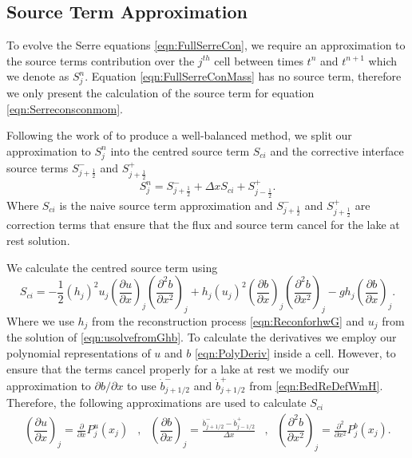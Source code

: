 \documentclass[times]{elsarticle}
\begin{document}
\subsection{Source Term Approximation}

To evolve the Serre equations \eqref{eqn:FullSerreCon}, we require an approximation to the source terms contribution over the $j^{th}$ cell between times $t^n$ and $t^{n+1}$ which we denote as $S^n_j$. Equation \eqref{eqn:FullSerreConMass} has no source term, therefore we only present the calculation of the source term for equation \eqref{eqn:Serreconsconmom}.

Following the work of \citet{Klein-etal-2004-2050} to produce a well-balanced method, we split our approximation to $S^n_j$ into the centred source term $S_{ci}$ and the corrective interface source terms $S^{-}_{j + \frac{1}{2}}$ and $S^{+}_{j + \frac{1}{2}}$
\begin{equation*}
S^n_j =  S^{-}_{j + \frac{1}{2}} + \Delta x S_{ci} + S^{+}_{j - \frac{1}{2}}.
\end{equation*}
Where $S_{ci}$ is the naive source term approximation and $S^{-}_{j + \frac{1}{2}}$ and $S^{+}_{j + \frac{1}{2}}$ are correction terms that ensure that the flux and source term cancel for the lake at rest solution. 

We calculate the centred source term using
\begin{equation*}
S_{ci} = -\frac{1}{2}\left(h_j\right)^2 {u_j}\left( \frac{\partial {u}}{\partial x} \right)_j \left(\frac{\partial^2 b}{\partial x^2} \right)_j  + h_j \left(u_j\right)^2 \left(\frac{\partial b}{\partial x}\right)_j \left(\frac{\partial^2 b}{\partial x^2}\right)_j - gh_j\left(\frac{\partial b}{\partial x}\right)_j.
\end{equation*}
Where we use $h_j$ from the reconstruction process \eqref{eqn:ReconforhwG} and $u_j$ from the solution of \eqref{eqn:usolvefromGhb}. To calculate the derivatives we employ our polynomial representations of $u$ and $b$ \eqref{eqn:PolyDeriv} inside a cell. However, to ensure that the terms cancel properly for a lake at rest we modify our approximation to ${\partial b}/{\partial x}$ to use $\dot{b}^-_{j+1/2}$ and $\dot{b}^+_{j+1/2}$ from \eqref{eqn:BedReDefWmH}. Therefore, the following approximations are used to calculate $S_{ci}$
\begin{align*}
\left(\dfrac{\partial {u}}{\partial x} \right)_{j} = \frac{\partial }{\partial x}P^u_j(x_{j})& , &  
\left(\dfrac{\partial {b}}{\partial x} \right)_{j} =  \frac{\dot{b}^-_{j+1/2} - \dot{b}^+_{j-1/2}}{\Delta x} &,& 	
\left(\dfrac{\partial^2 {b}}{\partial x^2} \right)_{j} = \frac{\partial^2 }{\partial x^2}P^b_j(x_{j}).
\end{align*}
\end{document}
